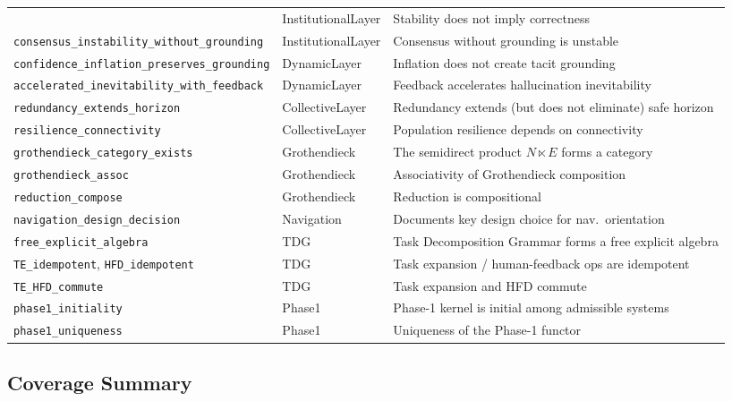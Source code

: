 \begin{center}
\begin{tabular}{p{5cm}lp{5cm}}
  & InstitutionalLayer & Stability does not imply correctness \\
\texttt{consensus\_instability\_without\_grounding}
  & InstitutionalLayer & Consensus without grounding is unstable \\
\texttt{confidence\_inflation\_preserves\_grounding}
  & DynamicLayer & Inflation does not create tacit grounding \\
\texttt{accelerated\_inevitability\_with\_feedback}
  & DynamicLayer & Feedback accelerates hallucination inevitability \\
\texttt{redundancy\_extends\_horizon}
  & CollectiveLayer & Redundancy extends (but does not eliminate) safe horizon \\
\texttt{resilience\_connectivity}
  & CollectiveLayer & Population resilience depends on connectivity \\
\texttt{grothendieck\_category\_exists}
  & Grothendieck & The semidirect product $N \ltimes E$ forms a category \\
\texttt{grothendieck\_assoc}
  & Grothendieck & Associativity of Grothendieck composition \\
\texttt{reduction\_compose}
  & Grothendieck & Reduction is compositional \\
\texttt{navigation\_design\_decision}
  & Navigation & Documents key design choice for nav.\ orientation \\
\texttt{free\_explicit\_algebra}
  & TDG & Task Decomposition Grammar forms a free explicit algebra \\
\texttt{TE\_idempotent}, \texttt{HFD\_idempotent}
  & TDG & Task expansion / human-feedback ops are idempotent \\
\texttt{TE\_HFD\_commute}
  & TDG & Task expansion and HFD commute \\
\texttt{phase1\_initiality}
  & Phase1 & Phase-1 kernel is initial among admissible systems \\
\texttt{phase1\_uniqueness}
  & Phase1 & Uniqueness of the Phase-1 functor \\
\bottomrule
\end{tabular}
\end{center}

\subsection*{Coverage Summary}

